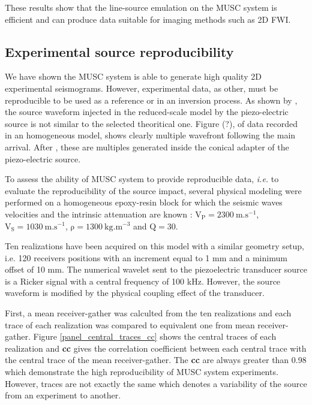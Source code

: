 \documentclass[manuscript,revised]{geophysics}
\begin{document}
\noindent These results show that the line-source emulation on the MUSC system is efficient and can produce data suitable for imaging methods such as 2D FWI.


\subsection{Experimental source reproducibility}

\noindent We have shown the MUSC system is able to generate high quality 2D experimental seismograms. However, experimental data, as other, must be reproducible to be used as a reference or in an inversion process. As shown by \citet{Bretaudeau_SSM_2011}, the source waveform injected in the reduced-scale model by the piezo-electric source is not similar to the selected theoritical one. Figure (?), of data recorded in an homogeneous model, shows clearly multiple wavefront following the main arrival. After \citet{Bretaudeau_SSM_2011}, these are multiples generated inside the conical adapter of the piezo-electric source.

\noindent To assess the ability of MUSC system to provide reproducible data, \textit{i.e.} to evaluate the reproducibility of the source impact, several physical modeling were performed on a homogeneous epoxy-resin block for which the seismic waves velocities and the intrinsic attenuation are known : $\mathrm{V_{P}=2300\ m.s^{-1}}$, $\mathrm{V_{S}=1030\ m.s^{-1}}$, $\mathrm{\rho=1300\ kg.m^{-3}}$ and $\mathrm{Q=30}$. 

\noindent Ten realizations have been acquired on this model with a similar geometry setup, i.e. 120 receivers positions with an increment equal to 1 mm and a minimum offset of 10 mm. The numerical wavelet sent to the piezoelectric transducer source is a Ricker signal with a central frequency of 100 kHz. However, the source waveform is modified by the physical coupling effect of the transducer. 

\noindent First, a mean receiver-gather was calculted from the ten realizations and each trace of each realization was compared to equivalent one from mean receiver-gather. Figure \ref{panel_central_traces_cc} shows the central traces of each realization and \textbf{cc} gives the correlation coefficient between each central trace with the central trace of the mean receiver-gather. The \textbf{cc} are always greater than 0.98 which demonstrate the high reproducibility of MUSC system experiments. However, traces are not exactly the same which denotes a variability of the source from an experiment to another.
 
\end{document}

